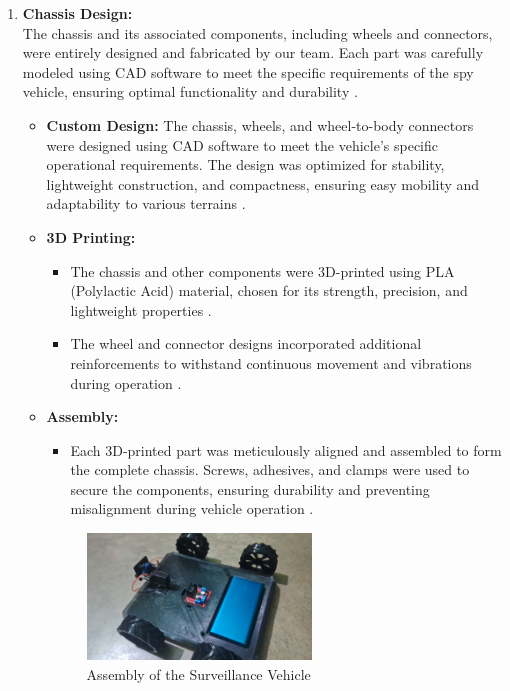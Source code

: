 \documentclass[12pt,a4paper]{report}
\begin{document}
\begin{enumerate}
    \item \textbf{Chassis Design:} \\
     The chassis and its associated components, including wheels and connectors, were entirely designed and fabricated by our team. Each part was carefully modeled using CAD software to meet the specific requirements of the spy vehicle, ensuring optimal functionality and durability \cite{3dprinting, circuitdesign}.
    \begin{itemize}

        \item \textbf{Custom Design:} The chassis, wheels, and wheel-to-body connectors were designed using CAD software to meet the vehicle’s specific operational requirements. The design was optimized for stability, lightweight construction, and compactness, ensuring easy mobility and adaptability to various terrains \cite{circuitdesign}.
        \item \textbf{3D Printing:} 
        \begin{itemize}
            \item The chassis and other components were 3D-printed using PLA (Polylactic Acid) material, chosen for its strength, precision, and lightweight properties \cite{3dprinting}.
            \item The wheel and connector designs incorporated additional reinforcements to withstand continuous movement and vibrations during operation \cite{3dprinting}.
        \end{itemize}
        \item \textbf{Assembly:} 
        \begin{itemize}
            \item Each 3D-printed part was meticulously aligned and assembled to form the complete chassis. Screws, adhesives, and clamps were used to secure the components, ensuring durability and preventing misalignment during vehicle operation \cite{3dprinting}.
        \end{itemize}
        
\begin{figure}[H]
    \centering
    \includegraphics[width=0.6\textwidth]{vehicle1}
    \caption{Assembly of the Surveillance Vehicle}
    \label{fig:vehicle1}
\end{figure}
     

\end{itemize}
\end{enumerate}
\end{document}
